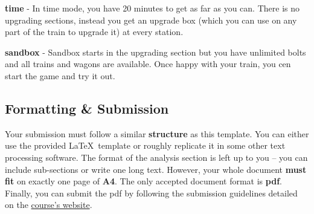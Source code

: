 \documentclass[a4paper,10pt,english]{article}
\begin{document}
\textbf{time} -
In time mode, you have 20 minutes to get as far as you can. There is no upgrading sections, instead you get an upgrade box (which you can use on any part of the train to upgrade it) at every station.

\textbf{sandbox} -
Sandbox starts in the upgrading section but you have unlimited bolts and all trains and wagons are available. Once happy with your train, you cen start the game and try it out.


\newpage
\subsection*{Formatting \& Submission}

Your submission must follow a similar \textbf{structure} as this template. You can either use the provided \LaTeX\ template or roughly replicate it in some other text processing software. The format of the analysis section is left up to you -- you can include sub-sections or write one long text. However, your whole document \textbf{must fit} on exactly one page of \textbf{A4}. The only accepted document format is \textbf{pdf}. Finally, you can submit the pdf by following the submission guidelines detailed on the \href{http://cphoto.fit.vutbr.cz/ludo/courses/izhv/exercises/sub/}{course's website}.
\end{document}
